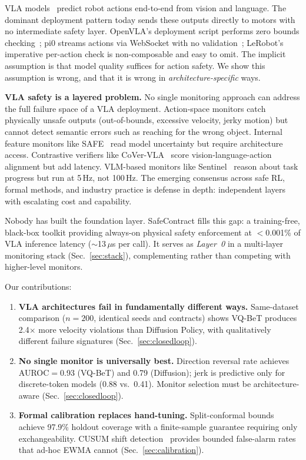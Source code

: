 \documentclass[conference]{IEEEtran}
\begin{document}
VLA models~\cite{openvla,smolvla} predict robot actions end-to-end from vision and language.
The dominant deployment pattern today sends these outputs directly to motors with no intermediate safety layer.
OpenVLA's deployment script performs zero bounds checking~\cite{openvla}; pi0 streams actions via WebSocket with no validation~\cite{pi0}; LeRobot's~\cite{lerobot} imperative per-action check is non-composable and easy to omit.
The implicit assumption is that model quality suffices for action safety.
We show this assumption is wrong, and that it is wrong in \emph{architecture-specific} ways.

\textbf{VLA safety is a layered problem.}
No single monitoring approach can address the full failure space of a VLA deployment.
Action-space monitors catch physically unsafe outputs (out-of-bounds, excessive velocity, jerky motion) but cannot detect semantic errors such as reaching for the wrong object.
Internal feature monitors like SAFE~\cite{safe2025} read model uncertainty but require architecture access.
Contrastive verifiers like CoVer-VLA~\cite{cover2026} score vision-language-action alignment but add latency.
VLM-based monitors like Sentinel~\cite{sentinel} reason about task progress but run at 5\,Hz, not 100\,Hz.
The emerging consensus across safe RL, formal methods, and industry practice is defense in depth: independent layers with escalating cost and capability.

Nobody has built the foundation layer.
SafeContract fills this gap: a training-free, black-box toolkit providing always-on physical safety enforcement at $<$0.001\% of VLA inference latency (${\sim}$13\,$\mu$s per call).
It serves as \emph{Layer~0} in a multi-layer monitoring stack (Sec.~\ref{sec:stack}), complementing rather than competing with higher-level monitors.

Our contributions:
\begin{enumerate}
    \item \textbf{VLA architectures fail in fundamentally different ways.} Same-dataset comparison ($n{=}200$, identical seeds and contracts) shows VQ-BeT produces 2.4$\times$ more velocity violations than Diffusion Policy, with qualitatively different failure signatures (Sec.~\ref{sec:closedloop}).
    \item \textbf{No single monitor is universally best.} Direction reversal rate achieves AUROC${=}$0.93 (VQ-BeT) and 0.79 (Diffusion); jerk is predictive only for discrete-token models (0.88 vs.\ 0.41). Monitor selection must be architecture-aware (Sec.~\ref{sec:closedloop}).
    \item \textbf{Formal calibration replaces hand-tuning.} Split-conformal bounds~\cite{vovk2005} achieve 97.9\% holdout coverage with a finite-sample guarantee requiring only exchangeability. CUSUM shift detection~\cite{page1954} provides bounded false-alarm rates that ad-hoc EWMA cannot (Sec.~\ref{sec:calibration}).
\end{enumerate}
\end{document}
